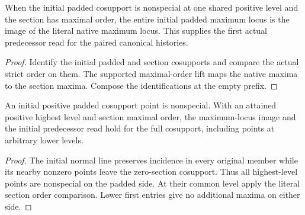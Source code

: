 \begin{theorem}
\label{hir:g1-initial-literal-native-read}
\leanok
When the initial padded cosupport is nonspecial at one shared
positive level and the section has maximal order, the entire
initial padded maximum locus is the image of the literal native
maximum locus. This supplies the first actual predecessor read
for the paired canonical histories.
\end{theorem}
\begin{proof}
Identify the initial padded and section cosupports and compare
the actual strict order on them. The supported maximal-order
lift maps the native maxima to the section maxima. Compose
the identifications at the empty prefix.
\end{proof}

\begin{theorem}
\label{hir:g1-initial-literal-native-top-read}
\leanok
An initial positive padded cosupport point is nonspecial.
With an attained positive highest level and section maximal
order, the maximum-locus image and the initial predecessor
read hold for the full cosupport, including points at
arbitrary lower levels.
\end{theorem}
\begin{proof}
The initial normal line preserves incidence in every original
member while its nearby nonzero points leave the zero-section
cosupport. Thus all highest-level points are nonspecial on the
padded side. At their common level apply the literal section
order comparison. Lower first entries give no additional
maxima on either side.
\end{proof}


